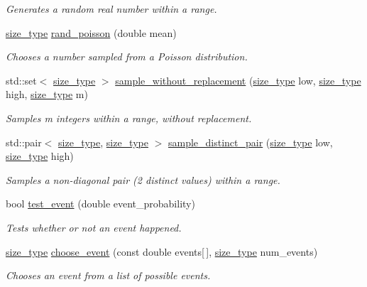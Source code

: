\begin{DoxyCompactItemize}
\begin{DoxyCompactList}\small\item\em Generates a random real number within a range. \end{DoxyCompactList}\item 
\hyperlink{namespaceretrocombinator_a8e1541b50cee66a791df4c437ccbb385}{size\+\_\+type} \hyperlink{classretrocombinator_1_1RandMaths_adef66efd4d58f6130982ff0ee0e25750}{rand\+\_\+poisson} (double mean)
\begin{DoxyCompactList}\small\item\em Chooses a number sampled from a Poisson distribution. \end{DoxyCompactList}\item 
std\+::set$<$ \hyperlink{namespaceretrocombinator_a8e1541b50cee66a791df4c437ccbb385}{size\+\_\+type} $>$ \hyperlink{classretrocombinator_1_1RandMaths_a6a7fe159f46afec51d997e4d07d2cfe6}{sample\+\_\+without\+\_\+replacement} (\hyperlink{namespaceretrocombinator_a8e1541b50cee66a791df4c437ccbb385}{size\+\_\+type} low, \hyperlink{namespaceretrocombinator_a8e1541b50cee66a791df4c437ccbb385}{size\+\_\+type} high, \hyperlink{namespaceretrocombinator_a8e1541b50cee66a791df4c437ccbb385}{size\+\_\+type} m)
\begin{DoxyCompactList}\small\item\em Samples {\itshape m} integers within a range, without replacement. \end{DoxyCompactList}\item 
std\+::pair$<$ \hyperlink{namespaceretrocombinator_a8e1541b50cee66a791df4c437ccbb385}{size\+\_\+type}, \hyperlink{namespaceretrocombinator_a8e1541b50cee66a791df4c437ccbb385}{size\+\_\+type} $>$ \hyperlink{classretrocombinator_1_1RandMaths_a2758ba7c9818bc664c4b751a697e1fe6}{sample\+\_\+distinct\+\_\+pair} (\hyperlink{namespaceretrocombinator_a8e1541b50cee66a791df4c437ccbb385}{size\+\_\+type} low, \hyperlink{namespaceretrocombinator_a8e1541b50cee66a791df4c437ccbb385}{size\+\_\+type} high)
\begin{DoxyCompactList}\small\item\em Samples a non-\/diagonal pair (2 distinct values) within a range. \end{DoxyCompactList}\item 
bool \hyperlink{classretrocombinator_1_1RandMaths_a183686140a9da18ad40c7e048ee8914e}{test\+\_\+event} (double event\+\_\+probability)
\begin{DoxyCompactList}\small\item\em Tests whether or not an event happened. \end{DoxyCompactList}\item 
\hyperlink{namespaceretrocombinator_a8e1541b50cee66a791df4c437ccbb385}{size\+\_\+type} \hyperlink{classretrocombinator_1_1RandMaths_a3834f9a074546f0d588247610f16fb0e}{choose\+\_\+event} (const double events\mbox{[}$\,$\mbox{]}, \hyperlink{namespaceretrocombinator_a8e1541b50cee66a791df4c437ccbb385}{size\+\_\+type} num\+\_\+events)
\begin{DoxyCompactList}\small\item\em Chooses an event from a list of possible events. \end{DoxyCompactList}\end{DoxyCompactItemize}
